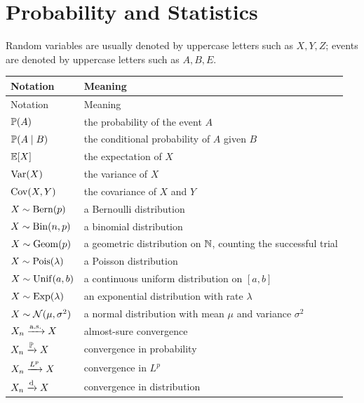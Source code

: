     \section*{Probability and Statistics}

    Random variables are usually denoted by uppercase letters such as $X,Y,Z$;
    events are denoted by uppercase letters such as $A,B,E$.

    \vspace{0.5em}

    {\small
    \renewcommand{\arraystretch}{1.18}
    \begin{longtable}{@{}L{0.27\textwidth}L{0.65\textwidth}@{}}
        \toprule
        Notation & Meaning \\
        \midrule
        \endfirsthead

        \toprule
        Notation & Meaning \\
        \midrule
        \endhead

        \bottomrule
        \endlastfoot

        $\mathbb{P}(A)$ & the probability of the event $A$ \\
        $\mathbb{P}(A\mid B)$ & the conditional probability of $A$ given $B$ \\
        $\mathbb{E}[X]$ & the expectation of $X$ \\
        $\operatorname{Var}(X)$ & the variance of $X$ \\
        $\operatorname{Cov}(X,Y)$ & the covariance of $X$ and $Y$ \\
        $X\sim\operatorname{Bern}(p)$ & a Bernoulli distribution \\
        $X\sim\operatorname{Bin}(n,p)$ & a binomial distribution \\
        $X\sim\operatorname{Geom}(p)$ & a geometric distribution on $\mathbb{N}$, counting the successful trial \\
        $X\sim\operatorname{Pois}(\lambda)$ & a Poisson distribution \\
        $X\sim\operatorname{Unif}(a,b)$ & a continuous uniform distribution on $[a,b]$ \\
        $X\sim\operatorname{Exp}(\lambda)$ & an exponential distribution with rate $\lambda$ \\
        $X\sim\mathcal{N}(\mu,\sigma^2)$ & a normal distribution with mean $\mu$ and variance $\sigma^2$ \\
        $X_n\xrightarrow{\mathrm{a.s.}} X$ & almost-sure convergence \\
        $X_n\xrightarrow{\mathbb{P}} X$ & convergence in probability \\
        $X_n\xrightarrow{L^{p}}X$ & convergence in $L^p$ \\
        $X_n\xrightarrow{\mathrm{d}} X$ & convergence in distribution \\
    \end{longtable}
    }

